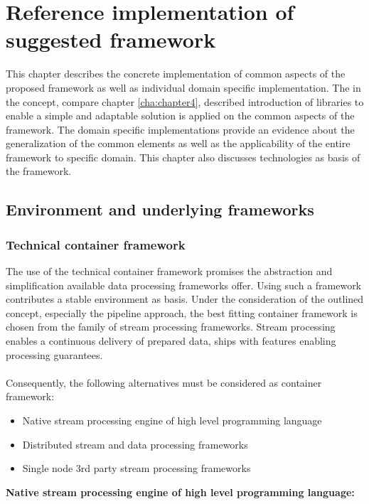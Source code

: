 \chapter{Reference implementation of suggested framework\label{cha:chapter5}}

This chapter describes the concrete implementation of common aspects of the proposed framework as well as individual domain specific implementation. The in the concept, compare chapter \ref{cha:chapter4}, described introduction of libraries to enable a simple and adaptable solution is applied on the common aspects of the framework. The domain specific implementations provide an evidence about the generalization of the common elements as well as the applicability of the entire framework to specific domain. This chapter also discusses technologies as basis of the framework. 

\section{Environment and underlying frameworks\label{sec:env}}

\subsection{Technical container framework}

The use of the technical container framework promises the abstraction and simplification available data processing frameworks offer. Using such a framework contributes a stable environment as basis. Under the consideration of the outlined concept, especially the pipeline approach, the best fitting container framework is chosen from the family of stream processing frameworks. Stream processing enables a continuous delivery of prepared data, ships with features enabling processing guarantees.
\\\\
Consequently, the following alternatives must be considered as container framework:
\begin{itemize}
\item Native stream processing engine of high level programming language
\item Distributed stream and data processing frameworks
\item Single node 3rd party stream processing frameworks\\
\end{itemize}

\noindent\textbf{Native stream processing engine of high level programming language:}

